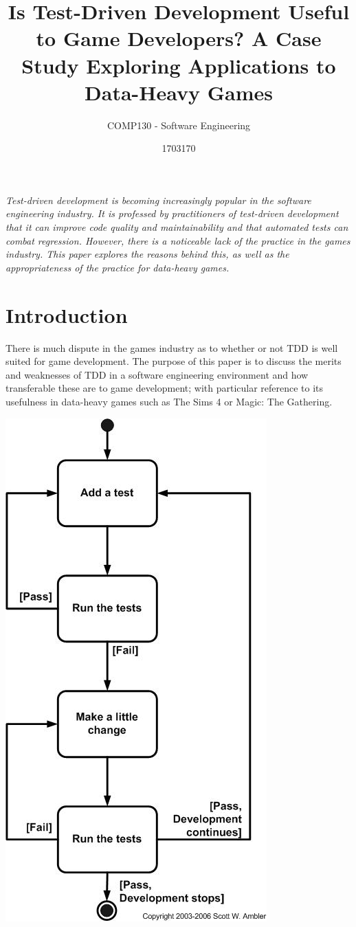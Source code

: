 \documentclass{scrartcl}
\title{Is Test-Driven Development Useful to Game Developers? 
A Case Study Exploring Applications to Data-Heavy Games}
\subtitle{COMP130 - Software Engineering}
\author{1703170}
\begin{document}
\maketitle

\textit{Test-driven development is becoming increasingly popular in the software engineering industry. It is professed by practitioners of test-driven development that it can improve code quality and maintainability and that automated tests can combat regression. However, there is a noticeable lack of the practice in the games industry. This paper explores the reasons behind this, as well as the appropriateness of the practice for data-heavy games.  }



\section{Introduction}

There is much dispute in the games industry as to whether or not TDD is well suited for game development. The purpose of this paper is to discuss the merits and weaknesses of TDD in a software engineering environment and how transferable these are to game development; with particular reference to its usefulness in data-heavy games such as The Sims 4 or Magic: The Gathering.

\begin{center}
\includegraphics[scale=0.4]{tddSteps.png}
\end{center}
\end{document}
